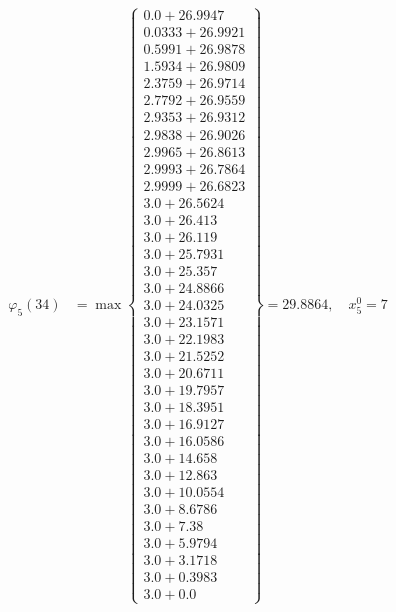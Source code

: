 \documentclass{article}
\begin{document}
\begin{align*}
  
\varphi_{5}(34) &= \max \left\{ \begin{array}{c}
0.0 + 26.9947 \\
 0.0333 + 26.9921 \\
 0.5991 + 26.9878 \\
 1.5934 + 26.9809 \\
 2.3759 + 26.9714 \\
 2.7792 + 26.9559 \\
 2.9353 + 26.9312 \\
 2.9838 + 26.9026 \\
 2.9965 + 26.8613 \\
 2.9993 + 26.7864 \\
 2.9999 + 26.6823 \\
 3.0 + 26.5624 \\
 3.0 + 26.413 \\
 3.0 + 26.119 \\
 3.0 + 25.7931 \\
 3.0 + 25.357 \\
 3.0 + 24.8866 \\
 3.0 + 24.0325 \\
 3.0 + 23.1571 \\
 3.0 + 22.1983 \\
 3.0 + 21.5252 \\
 3.0 + 20.6711 \\
 3.0 + 19.7957 \\
 3.0 + 18.3951 \\
 3.0 + 16.9127 \\
 3.0 + 16.0586 \\
 3.0 + 14.658 \\
 3.0 + 12.863 \\
 3.0 + 10.0554 \\
 3.0 + 8.6786 \\
 3.0 + 7.38 \\
 3.0 + 5.9794 \\
 3.0 + 3.1718 \\
 3.0 + 0.3983 \\
 3.0 + 0.0
\end{array} \right\}=29.8864,\quad x_{5}^0=7\\
  
  
  

\end{align*}
\end{document}
